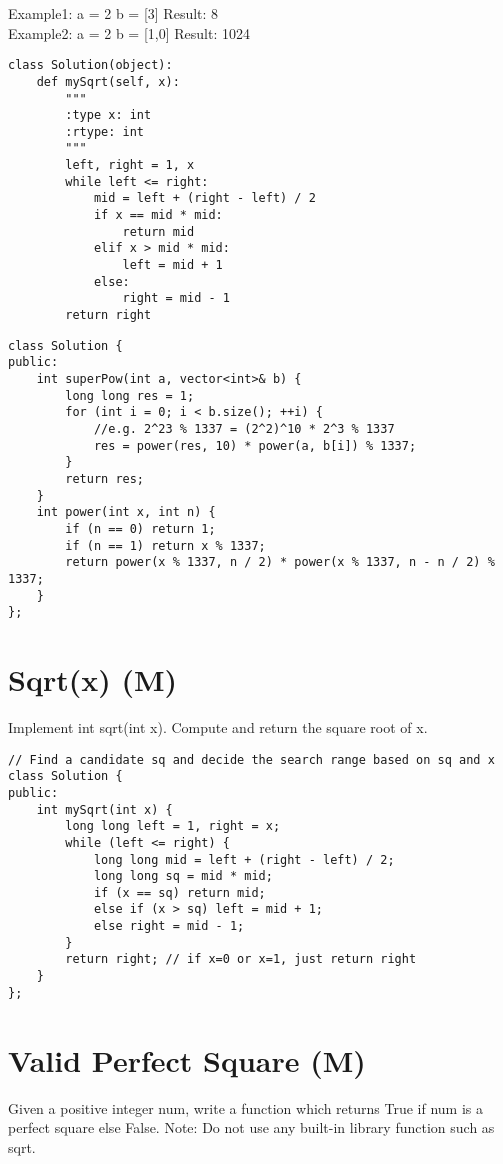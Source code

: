 Example1:
a = 2
b = [3]
Result: 8\\

Example2:
a = 2
b = [1,0]
Result: 1024\\

\begin{lstlisting}
class Solution(object):
    def mySqrt(self, x):
        """
        :type x: int
        :rtype: int
        """
        left, right = 1, x
        while left <= right:
            mid = left + (right - left) / 2
            if x == mid * mid:
                return mid
            elif x > mid * mid:
                left = mid + 1
            else:
                right = mid - 1   
        return right
\end{lstlisting}

\begin{lstlisting}
class Solution {
public:
    int superPow(int a, vector<int>& b) {
        long long res = 1;
        for (int i = 0; i < b.size(); ++i) {
            //e.g. 2^23 % 1337 = (2^2)^10 * 2^3 % 1337
            res = power(res, 10) * power(a, b[i]) % 1337;
        }
        return res;
    }
    int power(int x, int n) {
        if (n == 0) return 1;
        if (n == 1) return x % 1337;
        return power(x % 1337, n / 2) * power(x % 1337, n - n / 2) % 1337;
    }
};
\end{lstlisting}


\section{Sqrt(x) (M)}
Implement int sqrt(int x). Compute and return the square root of x. \\

\begin{lstlisting}
// Find a candidate sq and decide the search range based on sq and x
class Solution {
public:
    int mySqrt(int x) {
        long long left = 1, right = x;
        while (left <= right) {
            long long mid = left + (right - left) / 2;
            long long sq = mid * mid; 
            if (x == sq) return mid;
            else if (x > sq) left = mid + 1;
            else right = mid - 1;
        }
        return right; // if x=0 or x=1, just return right
    }
};
\end{lstlisting}


\section{Valid Perfect Square (M)}
Given a positive integer num, write a function which returns True if num is a perfect square else False. Note: Do not use any built-in library function such as sqrt.\\

